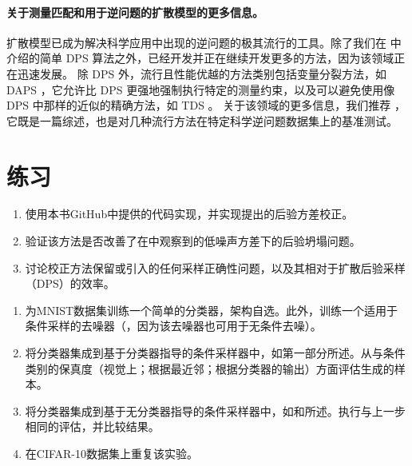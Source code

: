\documentclass[../../book-main.tex]{subfiles}
\begin{document}
\paragraph{关于测量匹配和用于逆问题的扩散模型的更多信息。}

扩散模型已成为解决科学应用中出现的逆问题的极其流行的工具。除了我们在  中介绍的简单 DPS 算法之外，已经开发并正在继续开发更多的方法，因为该领域正在迅速发展。
除 DPS 外，流行且性能优越的方法类别包括变量分裂方法，如 DAPS \cite{Zhang2024-ha}，它允许比 DPS 更强地强制执行特定的测量约束，以及可以避免使用像 DPS 中那样的近似的精确方法，如 TDS \cite{wu2023practical}。
关于该领域的更多信息，我们推荐 \cite{zheng2025inversebench}，它既是一篇综述，也是对几种流行方法在特定科学逆问题数据集上的基准测试。

\section{练习}

\begin{exercise}[对DPS的后验方差校正]

\begin{enumerate}
\item 使用本书GitHub中提供的代码实现，并实现\textcite{rozet2024learning}提出的后验方差校正。
\item 验证该方法是否改善了在中观察到的低噪声方差下的后验坍塌问题。
\item 讨论校正方法保留或引入的任何采样正确性问题，以及其相对于扩散后验采样（DPS）的效率。
\end{enumerate}

\end{exercise}

\begin{exercise}[在MNIST上的条件采样]
\begin{enumerate}
\item 为MNIST数据集训练一个简单的分类器，架构自选。此外，训练一个适用于条件采样的去噪器（，因为该去噪器也可用于无条件去噪）。
\item 将分类器集成到基于分类器指导的条件采样器中，如第一部分所述。从与条件类别的保真度（视觉上；根据最近邻；根据分类器的输出）方面评估生成的样本。
\item 将分类器集成到基于无分类器指导的条件采样器中，如和所述。执行与上一步相同的评估，并比较结果。
\item 在CIFAR-10数据集上重复该实验。
\end{enumerate}

\end{exercise}
\end{document}
